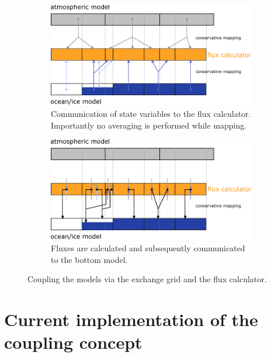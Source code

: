 \documentclass[a4paper,titlepage]{scrartcl}
\begin{document}
\begin{figure}[H]
	\centering
    \begin{subfigure}[t]{0.48\textwidth}
        \centering
		\includegraphics[width=\linewidth]{"./figures/exchange_grid_mapping1.pdf"} 
		\caption{
		\label{fig:exchange_grid_mapping1}
		Communication of state variables to the flux calculator. Importantly no averaging is performed while mapping.
		}
		\end{subfigure}
    \hfill
    \begin{subfigure}[t]{0.48\textwidth}
        \centering
		\includegraphics[width=\linewidth]{"./figures/exchange_grid_mapping2.pdf"}
		\caption{
		\label{fig:exchange_grid_mapping2}
		Fluxes are calculated and subsequently communicated to the bottom model.
		}
	\end{subfigure}
	\caption{Coupling the models via the exchange grid and the flux calculator.}
\end{figure}

\section{Current implementation of the coupling concept}
\end{document}
